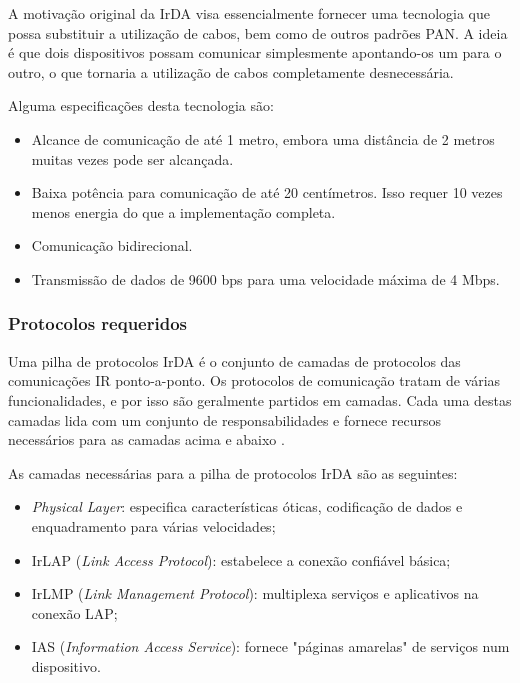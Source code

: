 \documentclass[conference]{IEEEtran}
\begin{document}
A motivação original da IrDA visa essencialmente fornecer uma tecnologia que possa substituir a utilização de cabos, bem como de outros padrões PAN. 
A ideia é que dois dispositivos possam comunicar simplesmente apontando-os um para o outro, o que tornaria a utilização de cabos completamente desnecessária. 

Alguma especificações desta tecnologia são:

\begin{itemize}

 \item Alcance de comunicação de até 1 metro, embora uma distância de 2 metros muitas vezes pode ser alcançada.
 \item Baixa potência para comunicação de até 20 centímetros. Isso requer 10 vezes menos energia do que a implementação completa.
 \item Comunicação bidirecional.
 \item Transmissão de dados de 9600 bps para uma velocidade máxima de 4 Mbps.

\end{itemize}


\subsubsection{Protocolos requeridos}

Uma pilha de protocolos IrDA é o conjunto de camadas de protocolos das comunicações IR ponto-a-ponto. 
Os protocolos de comunicação tratam de várias funcionalidades, e por isso são geralmente partidos em camadas. 
Cada uma destas camadas lida com um conjunto de responsabilidades e fornece recursos necessários para as camadas acima e abaixo \cite{megowan1996irda}.

As camadas necessárias para a pilha de protocolos IrDA são as seguintes:

\begin{itemize}

 \item \textit{Physical Layer}: especifica características óticas, codificação de dados e enquadramento para várias velocidades;
 \item IrLAP (\textit{Link Access Protocol}): estabelece a conexão confiável básica;
 \item IrLMP (\textit{Link Management Protocol}): multiplexa serviços e aplicativos na conexão LAP;
 \item IAS (\textit{Information Access Service}): fornece "páginas amarelas" de serviços num dispositivo.

\end{itemize}
\end{document}
